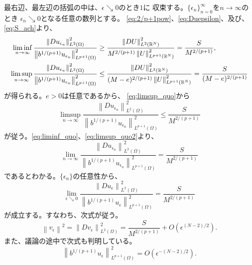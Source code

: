 最右辺、最左辺の括弧の中は、$\epsilon \searrow 0$のとき$1$に
収束する。$\{ \epsilon_n \}_{n=0}^\infty$を$n \to \infty$のとき
$\epsilon_n \searrow 0$となる任意の数列とする。
\eqref{eq:2/p+1pow}、\eqref{eq:Duepsilon}、及び、
\eqref{eq:S_ach}より、
\begin{align}
 \liminf_{n \to \infty} \frac{\left\| Du_{\epsilon_n}
 \right\|_{L^2(\Omega)}^2}{\left\| b^{1/(p+1)} u_{\epsilon_n}
 \right\|_{L^{p+1}(\Omega)}^2} &\geq 
 \frac{\left\| DU \right\|_{L^2(\mathbb{R}^N)}^2}
   {M^{2/(p+1)} \left\| U \right\|_{L^{p+1}(\mathbb{R}^N)}^2} 
 = \frac{S}{M^{2/(p+1)}}, \label{eq:liminf_quo} \\ 
 \limsup_{n \to \infty} \frac{\left\| Du_{\epsilon_n}
 \right\|_{L^2(\Omega)}^2}{\left\| b^{1/(p+1)} u_{\epsilon_n}
 \right\|_{L^{p+1}(\Omega)}^2} &\leq 
 \frac{\left\| DU \right\|_{L^2(\mathbb{R}^N)}^2}
   {(M-e)^{2/(p+1)} \left\| U \right\|_{L^{p+1}(\mathbb{R}^N)}^2} 
 = \frac{S}{(M-e)^{2/(p+1)}} \label{eq:limsup_quo}
\end{align}
が得られる。$e > 0$は任意であるから、
\eqref{eq:limsup_quo}から
\begin{equation}
 \limsup_{n \to \infty} \frac{\left\| Du_{\epsilon_n}
 \right\|_{L^2(\Omega)}^2}{\left\| b^{1/(p+1)} u_{\epsilon_n}
 \right\|_{L^{p+1}(\Omega)}^2} \leq 
 \frac{S}{M^{2/(p+1)}} \label{eq:limsup_quo2}
\end{equation}
が従う。\eqref{eq:liminf_quo}、\eqref{eq:limsup_quo2}より、
\[
 \lim_{n \to \infty} \frac{\left\| Du_{\epsilon_n}
 \right\|_{L^2(\Omega)}^2}{\left\| b^{1/(p+1)} u_{\epsilon_n}
 \right\|_{L^{p+1}(\Omega)}^2} =
 \frac{S}{M^{2/(p+1)}}
\]
であるとわかる。$\{ \epsilon_n \}$の任意性から、
\[
 \lim_{\epsilon \searrow 0} \frac{\left\| Du_{\epsilon}
 \right\|_{L^2(\Omega)}^2}{\left\| b^{1/(p+1)} u_{\epsilon}
 \right\|_{L^{p+1}(\Omega)}^2} =
 \frac{S}{M^{2/(p+1)}}
\]
が成立する。すなわち、次式が従う。
\begin{equation}
 \left\| v_\epsilon \right\|^2 = \left\| Dv_\epsilon
                                 \right\|^2_{L^2(\Omega)} 
 = \frac{S}{M^{2/(p+1)}} + O(\epsilon^{(N-2)/2}). \label{eq:vepsilon}
\end{equation}
また、議論の途中で次式も判明している。
\begin{equation}
 \left\| b^{1/(p+1)} u_\epsilon \right\|_{L^{p+1}(\Omega)}^2 = 
 O(\epsilon^{-(N-2)/2}). \label{eq:buepsilon}
\end{equation}

